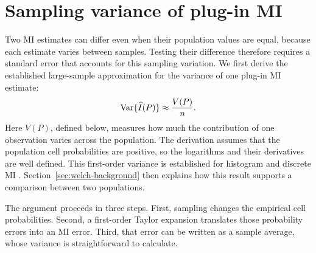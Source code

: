 \allowdisplaybreaks[0]
\section{Sampling variance of plug-in MI}
\label{sec:first-order-mi-background}

Two MI estimates can differ even when their population values are equal,
because each estimate varies between samples. Testing their difference
therefore requires a standard error that accounts for this sampling
variation. We first derive the established large-sample approximation
for the variance of one plug-in MI estimate:
\begin{equation}
  \operatorname{Var}\{\widehat I(P)\}\approx\frac{V(P)}{n}.
  \label{eq:first-order-mi-var-background}
\end{equation}
Here \(V(P)\), defined below, measures how much the contribution of one
observation varies across the population. The derivation assumes that the
population cell probabilities are positive, so the logarithms and their
derivatives are well defined. This first-order variance is established for
histogram and discrete MI \citep{moddemeijer1989,brillinger2004}.
Section~\ref{sec:welch-background} then explains how this result supports
a comparison between two populations.

The argument proceeds in three steps. First, sampling changes the empirical
cell probabilities. Second, a first-order Taylor expansion translates those
probability errors into an MI error. Third, that error can be written as a
sample average, whose variance is straightforward to calculate.

\medskip
{}

